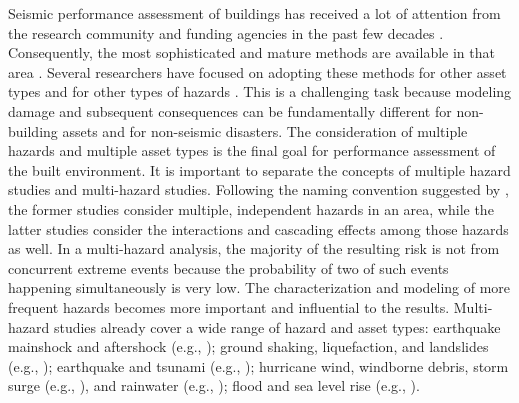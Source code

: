 \begin{partbacktext}
Seismic performance assessment of buildings has received a lot of attention from the research community and funding agencies in the past few decades \citep{atc1985atc13, fema1997guidelines, fajfar2004performancebased, kircher2006hazus}. Consequently, the most sophisticated and mature methods are available in that area \citep{atc2012p-58}. Several researchers have focused on adopting these methods for other asset types \citep{werner2006redars, chmielewski2016response} and for other types of hazards \citep{vickery2006hazus, bernardini2015performance, attary2017performancebased, barbato2013performancebased, lange2014application}. This is a challenging task because modeling damage and subsequent consequences can be fundamentally different for non-building assets and for non-seismic disasters.  
The consideration of multiple hazards and multiple asset types is the final goal for performance assessment of the built environment. It is important to separate the concepts of multiple hazard studies and multi-hazard studies. Following the naming convention suggested by \citet{bruneau2017state}, the former studies consider multiple, independent hazards in an area, while the latter studies consider the interactions and cascading effects among those hazards as well. In a multi-hazard analysis, the majority of the resulting risk is not from concurrent extreme events because the probability of two of such events happening simultaneously is very low. The characterization and modeling of more frequent hazards becomes more important and influential to the results. Multi-hazard studies already cover a wide range of hazard and asset types: earthquake mainshock and aftershock (e.g., \cite{nazari2015effect, zhang2013damage}); ground shaking, liquefaction, and landslides (e.g., \cite{elgamal2008three, kojima2014large}); earthquake and tsunami (e.g., \cite{akiyama2014reliability, carey2019multihazard}); hurricane wind, windborne debris, storm surge (e.g., \cite{lin2010windborne, park2014abv}), and rainwater (e.g., \cite{pita2012assessment}); flood and sea level rise (e.g., \cite{hinkel2014coastal}).

\end{partbacktext}
